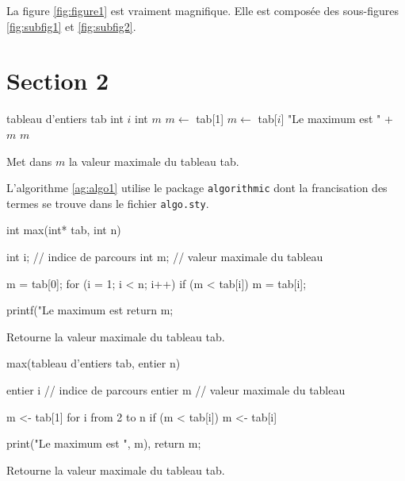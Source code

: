 La figure \ref{fig:figure1} est vraiment magnifique. Elle est composée des sous-figures \ref{fig:subfig1} et \ref{fig:subfig2}.

\section{Section 2}

\begin{algorithm}
  \begin{algorithmic}
    \STATE tableau d'entiers tab 
    \STATE int $i$ 
    \STATE int $m$ 
    \STATE
    \STATE $m \leftarrow$ tab[1]
        \STATE $m \leftarrow$ tab[$i$]
      \ENDIF
      \STATE
      \STATE \PRINT "Le maximum est " + $m$
      \RETURN $m$
    \ENDFOR
  \end{algorithmic}
  \caption[Algorithme 1 (nom dans la liste des algorithmes)]{Met dans $m$ la valeur maximale du tableau tab.\label{ag:algo1}}
\end{algorithm}

L'algorithme \ref{ag:algo1} utilise le package \texttt{algorithmic} dont la francisation des termes se trouve dans le fichier \texttt{algo.sty}.

\begin{algorithm}
  \begin{C}
int max(int* tab, int n) {
  int i; // indice de parcours
  int m; // valeur maximale du tableau
  
  m = tab[0];
  for (i = 1; i < n; i++) {
    if (m < tab[i]) {
      m = tab[i];
    }
  }
  
  printf("Le maximum est %
  return m;
}
  \end{C}
  \caption[Algo en C]{Retourne la valeur maximale du tableau tab.\label{ag:algoc}}
\end{algorithm}

\begin{algorithm}
  \begin{PseudoCode}
max(tableau d'entiers tab, entier n) {
  entier i // indice de parcours
  entier m // valeur maximale du tableau
  
  m <- tab[1]
  for i from 2 to n {
    if (m < tab[i]) {
      m <- tab[i]
    }
  }
  
  print("Le maximum est ", m),
  return m;
}
  \end{PseudoCode}
  \caption[Algo en PseudoCode]{Retourne la valeur maximale du tableau tab.\label{ag:algop}}
\end{algorithm}

